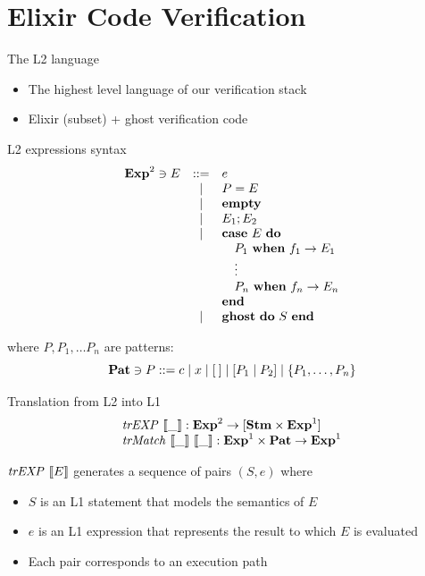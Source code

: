 \documentclass{beamer}
\begin{document}
  \section{Elixir Code Verification}
  \begin{frame}{The L2 language}
    \begin{itemize}
      \item \pause The highest level language of our verification stack
      \item \pause Elixir (subset) + ghost verification code
    \end{itemize}
  \end{frame}
  \begin{frame}{L2 expressions syntax}
    \[
      \begin{array}{rcll}
      \mathbf{Exp}^{2} \ni E & ::= & e \\
      & | & P = E \\
      & | & \textbf{empty} \\
      & | & E_1; E_2 \\
      & | & \textbf{case}~E~\textbf{do} \\
      & & \quad P_1~\textbf{when}~f_1 \rightarrow E_1 \\
      & & \quad \vdots\\
      & & \quad P_n~\textbf{when}~f_n \rightarrow E_n \\
      & & \textbf{end} \\
      & | & \textbf{ghost}~\textbf{do}~S~\textbf{end} \\
      \end{array}
    \]

    \pause where $P, P_1, \dots P_n$ are patterns:
    \[
      \mathbf{Pat} \ni P ::= c \mid x \mid [\:] \mid [P_1 \mid P_2] \mid \{ P_1, \ldots, P_n \}
    \]
  \end{frame}
  \begin{frame}{Translation from L2 into L1}
    \[
      \begin{array}{ll}
        \mathit{trEXP}~\llbracket\_\rrbracket : \mathbf{Exp}^{2} \rightarrow [\mathbf{Stm} \times \mathbf{Exp}^{1}]\\
        \mathit{trMatch}~\llbracket\_\rrbracket~\llbracket\_\rrbracket : \mathbf{Exp}^{1} \times \mathbf{Pat} \rightarrow \mathbf{Exp}^{1}
      \end{array}
    \]

    \pause $\mathit{trEXP}~\llbracket E\rrbracket$ generates a sequence of pairs $(S, e)$ where
    \begin{itemize}
      \item \pause $S$ is an L1 statement that models the semantics of $E$
      \item \pause $e$ is an L1 expression that represents the result to which $E$ is evaluated
      \item \pause Each pair corresponds to an execution path
    \end{itemize}
  \end{frame}
\end{document}

